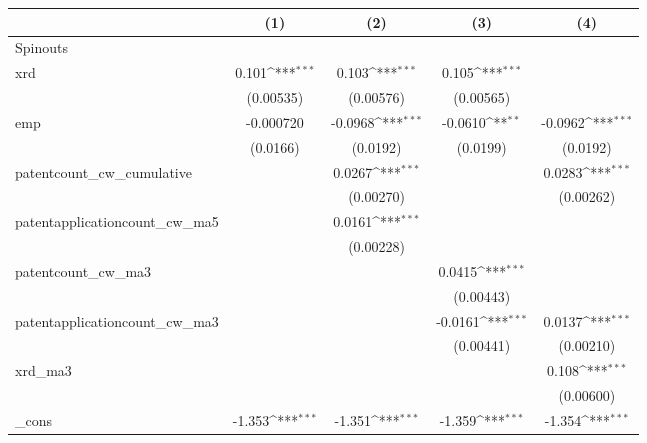 {
\def\sym#1{\ifmmode^{#1}\else\(^{#1}\)\fi}
\begin{tabular}{l*{4}{c}}
\hline\hline
            &\multicolumn{1}{c}{(1)}         &\multicolumn{1}{c}{(2)}         &\multicolumn{1}{c}{(3)}         &\multicolumn{1}{c}{(4)}         \\
\hline
Spinouts    &                     &                     &                     &                     \\
xrd         &       0.101\sym{***}&       0.103\sym{***}&       0.105\sym{***}&                     \\
            &   (0.00535)         &   (0.00576)         &   (0.00565)         &                     \\
[1em]
emp         &   -0.000720         &     -0.0968\sym{***}&     -0.0610\sym{**} &     -0.0962\sym{***}\\
            &    (0.0166)         &    (0.0192)         &    (0.0199)         &    (0.0192)         \\
[1em]
patentcount\_cw\_cumulative&                     &      0.0267\sym{***}&                     &      0.0283\sym{***}\\
            &                     &   (0.00270)         &                     &   (0.00262)         \\
[1em]
patentapplicationcount\_cw\_ma5&                     &      0.0161\sym{***}&                     &                     \\
            &                     &   (0.00228)         &                     &                     \\
[1em]
patentcount\_cw\_ma3&                     &                     &      0.0415\sym{***}&                     \\
            &                     &                     &   (0.00443)         &                     \\
[1em]
patentapplicationcount\_cw\_ma3&                     &                     &     -0.0161\sym{***}&      0.0137\sym{***}\\
            &                     &                     &   (0.00441)         &   (0.00210)         \\
[1em]
xrd\_ma3     &                     &                     &                     &       0.108\sym{***}\\
            &                     &                     &                     &   (0.00600)         \\
[1em]
\_cons      &      -1.353\sym{***}&      -1.351\sym{***}&      -1.359\sym{***}&      -1.354\sym{***}\\

\end{tabular}}
